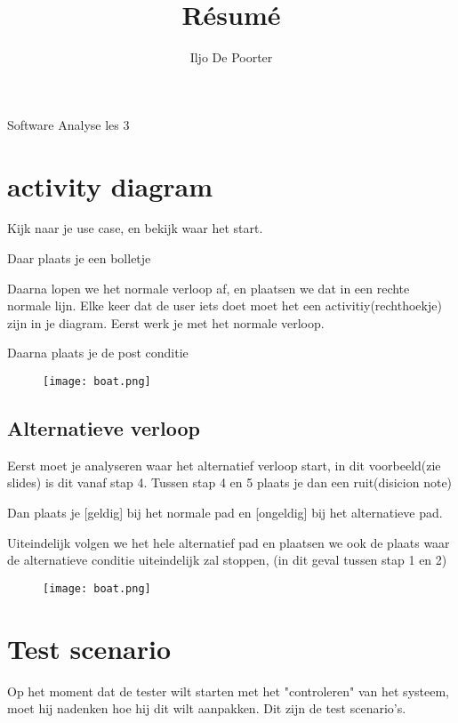 \documentclass{article}
\renewcommand{\maketitle}{
\begin{center}
{\huge\bfseries
\theauthor}

\vspace{.25em}
Software Analyse les 3
\end{center}
}
\begin{document}
\title{R\'esum\'e}
\author{Iljo De Poorter}

\maketitle
\section{activity diagram}
Kijk naar je use case, en bekijk waar het start.

Daar plaats je een bolletje

Daarna lopen we het normale verloop af, en plaatsen we dat in een rechte normale lijn. Elke keer dat de user iets doet moet het een activitiy(rechthoekje) zijn in je diagram. Eerst werk je met het normale verloop.

Daarna plaats je de post conditie

\begin{figure}[h]
  \texttt{[image: boat.png]}
\end{figure}

\subsection{Alternatieve verloop}

Eerst moet je analyseren waar het alternatief verloop start, in dit voorbeeld(zie slides) is dit vanaf stap 4.
Tussen stap 4 en 5 plaats je dan een ruit(disicion note)

Dan plaats je [geldig] bij het normale pad en [ongeldig] bij het alternatieve pad.

Uiteindelijk volgen we het hele alternatief pad en plaatsen we ook de plaats waar de alternatieve conditie uiteindelijk zal stoppen, (in dit geval tussen stap 1 en 2)

\begin{figure}[h]
  \texttt{[image: boat.png]}
\end{figure}

\section{Test scenario}

Op het moment dat de tester wilt starten met het "controleren" van het systeem, moet hij nadenken hoe hij dit wilt aanpakken. Dit zijn de test scenario's.
\end{document}
